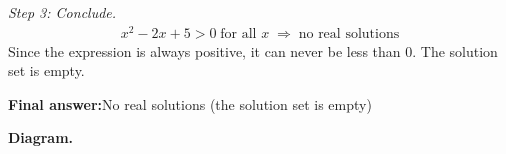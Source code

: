\documentclass[11pt]{article}
\begin{document}
\textit{Step 3: Conclude.}
\[\begin{gathered}
x^2 - 2x + 5 > 0 \;\text{for all } x \;\Longrightarrow\; \text{no real solutions}
\end{gathered}\]
Since the expression is always positive, it can never be less than 0. The solution set is empty.

\begin{answerbox}
\textbf{Final answer:}\quad No real solutions (the solution set is empty)
\end{answerbox}
\textbf{Diagram.}

\begin{center}
\end{center}
\end{document}
